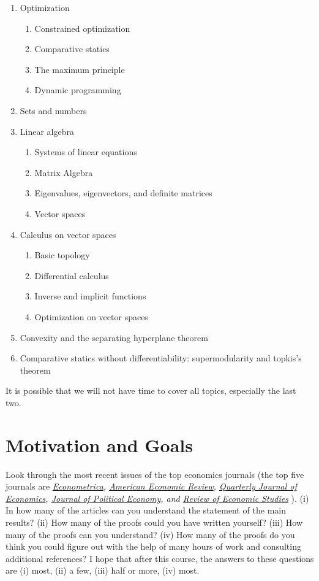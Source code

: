 \documentclass[10pt]{article}
\begin{document}
\begin{enumerate}
\item Optimization
  \begin{enumerate}
  \item Constrained optimization
  \item Comparative statics
  \item The maximum principle
  \item Dynamic programming
  \end{enumerate}
\item Sets and numbers
\item Linear algebra
  \begin{enumerate}
  \item Systems of linear equations 
  \item Matrix Algebra 
  \item Eigenvalues, eigenvectors, and definite matrices 
  \item Vector spaces
  \end{enumerate}
\item Calculus on vector spaces
  \begin{enumerate}
  \item Basic topology 
  \item Differential calculus 
  \item Inverse and implicit functions
  \item Optimization on vector spaces
  \end{enumerate}
\item Convexity and the separating hyperplane theorem
\item Comparative statics without differentiability: supermodularity
  and topkis's theorem 
\end{enumerate}
It is possible that we will not have time to cover all topics,
especially the last two.

\section{Motivation and Goals}

Look through the most recent issues of the top economics journals (the
top five journals are
{\slshape{\href{http://onlinelibrary.wiley.com/journal/10.1111/(ISSN)1468-0262}{Econometrica},
  \href{https://www.aeaweb.org/journals/aer}{American Economic
    Review}, \href{http://qje.oxfordjournals.org/}{Quarterly Journal
    of Economics},
  \href{http://www.journals.uchicago.edu/toc/jpe/current}{Journal of
    Political Economy}, and
  \href{http://restud.oxfordjournals.org/content/current}{Review of
    Economic Studies}}}
). (i) In how many of the articles can you
understand the statement of the main results? (ii) How many of the proofs
could you have written yourself?  (iii) How many of the proofs can you
understand? (iv) How many of the proofs do you think you could figure out
with the help of many hours of work and consulting additional
references? I hope that after this course, the answers to these
questions are (i) most, (ii) a few, (iii) half or more, (iv) most. 
\end{document}
